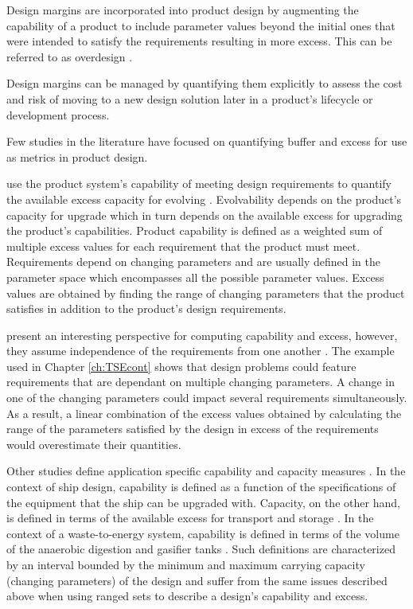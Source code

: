 Design margins are incorporated into product design by augmenting the capability of a product to include parameter values beyond the initial ones that were intended to satisfy the requirements resulting in more excess. This can be referred to as overdesign \cite{Eckert2019}.

Design margins can be managed by quantifying them explicitly to assess the cost and risk of moving to a new design solution later in a product's lifecycle or development process.

Few studies in the literature have focused on quantifying buffer and excess for use as metrics in product design.

\citeauthor{Tackett2014} use the product system's capability of meeting design requirements to quantify the available excess capacity for evolving \cite{Tackett2014}. Evolvability depends on the product's capacity for upgrade which in turn depends on the available excess for upgrading the product's capabilities. Product capability is defined as a weighted sum of multiple excess values for each requirement that the product must meet. Requirements depend on changing parameters and are usually defined in the parameter space which encompasses all the possible parameter values. Excess values are obtained by finding the range of changing parameters that the product satisfies in addition to the product's design requirements.

\citeauthor{Tackett2014} present an interesting perspective for computing capability and excess, however, they assume independence of the requirements from one another \cite{Tackett2014}. The example used in Chapter \ref{ch:TSEcont} shows that design problems could feature requirements that are dependant on multiple changing parameters. A change in one of the changing parameters could impact several requirements simultaneously. As a result, a linear combination of the excess values obtained by calculating the range of the parameters satisfied by the design in excess of the requirements would overestimate their quantities.

Other studies define application specific capability and capacity measures \cite{Rehn2018,Cardin2017}. In the context of ship design, capability is defined as a function of the specifications of the equipment that the ship can be upgraded with. Capacity, on the other hand, is defined in terms of the available excess for transport and storage \cite{Rehn2018}. In the context of a waste-to-energy system, capability is defined in terms of the volume of the anaerobic digestion and gasifier tanks \cite{Cardin2017}. Such definitions are characterized by an interval bounded by the minimum and maximum carrying capacity (changing parameters) of the design and suffer from the same issues described above when using ranged sets to describe a design's capability and excess.

